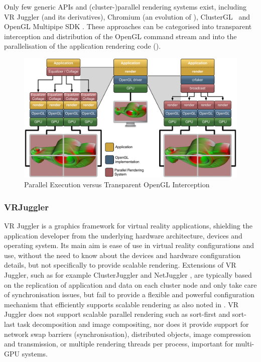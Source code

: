 Only few generic APIs and (cluster-)parallel rendering systems exist,
including VR Juggler \cite{BJHMBC:01} (and its derivatives), Chromium
\cite{HHNFAKK:02} (an evolution of \cite{Humphreys99,Humphreys00,HEBSEH:01}),
{ClusterGL}~\cite{NHM:11} and OpenGL Multipipe SDK
\cite{JDBJBCER:04,BRE:05,MPK}. These approaches can be categorised into
transparent interception and distribution of the OpenGL command stream and into
the parallelisation of the application rendering code ().

\begin{figure}[h!t]
 \includegraphics[width=\textwidth]{images/chromiumVsEq}
 \caption{Parallel Execution versus Transparent OpenGL Interception\label{fChromium}}
\end{figure}

\subsubsection{VRJuggler}

VR Juggler \cite{BJHMBC:01,JBBC:98} is a graphics framework for virtual reality
applications, shielding the application developer from the underlying
hardware architecture, devices and operating system. Its main aim is ease of use
in virtual reality configurations and use, without the need to know
about the devices and hardware configuration details, but not specifically to
provide scalable rendering. Extensions of VR Juggler, such as for example
ClusterJuggler \cite{BC:03} and NetJuggler \cite{AGLMR:02}, are typically based
on the replication of application and data on each cluster node and only
take care of synchronisation issues, but fail to provide a flexible and
powerful configuration mechanism that efficiently supports scalable rendering
as also noted in \cite{SWNH:03}. VR Juggler does not support scalable parallel
rendering such as sort-first and sort-last task decomposition and image
compositing, nor does it provide support for network swap barriers
(synchronisation), distributed objects, image compression and transmission, or
multiple rendering threads per process, important for multi-GPU systems.

